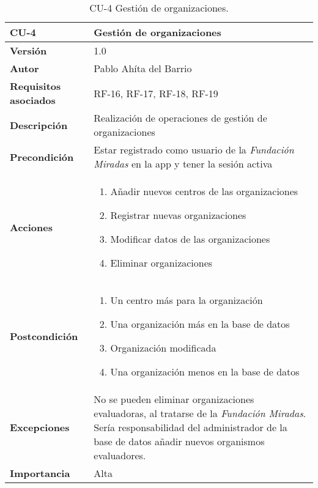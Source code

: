 \begin{table}[p]
	\centering
	\begin{tabularx}{\linewidth}{ p{} p{} }
		\toprule
		\textbf{CU-4}    & \textbf{Gestión de organizaciones}\\
		\toprule
		\textbf{Versión}              & 1.0    \\
		\textbf{Autor}                & Pablo Ahíta del Barrio \\
		\textbf{Requisitos asociados} & RF-16, RF-17, RF-18, RF-19  \\
		\textbf{Descripción}          & Realización de operaciones de gestión de organizaciones \\
		\textbf{Precondición}         & Estar registrado como usuario de la \textit{Fundación Miradas} en la app y tener la sesión activa \\
		\textbf{Acciones}             &
		\begin{enumerate}
			\def\labelenumi{\arabic{enumi}.}
			\tightlist
			\item Añadir nuevos centros de las organizaciones
			\item Registrar nuevas organizaciones
			\item Modificar datos de las organizaciones
			\item Eliminar organizaciones
		\end{enumerate}\\
		\textbf{Postcondición}        &  
		\begin{enumerate}
			\def\labelenumi{\arabic{enumi}.}
			\tightlist
			\item Un centro más para la organización
			\item Una organización más en la base de datos
			\item Organización modificada
			\item Una organización menos en la base de datos
		\end{enumerate}\\
		\textbf{Excepciones}          & No se pueden eliminar organizaciones
		evaluadoras, al tratarse de la \textit{Fundación Miradas}. Sería
		responsabilidad del administrador de la base de datos añadir nuevos
		organismos evaluadores. \\
		\textbf{Importancia}          & Alta \\
		\bottomrule
	\end{tabularx}
	\caption{CU-4 Gestión de organizaciones.}
\end{table}

